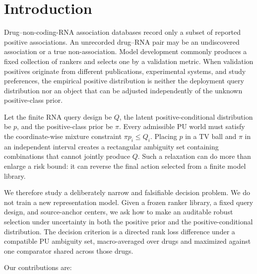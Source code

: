 \documentclass[preprint,review,12pt]{elsarticle}
\begin{document}
\section{Introduction}

Drug--non-coding-RNA association databases record only a subset of reported
positive associations. An unrecorded drug--RNA pair may be an undiscovered
association or a true non-association. Model development commonly produces a
fixed collection of rankers and selects one by a validation metric. When
validation positives originate from different publications, experimental
systems, and study preferences, the empirical positive distribution is neither
the deployment query distribution nor an object that can be adjusted
independently of the unknown positive-class prior.

Let the finite RNA query design be \(Q\), the latent positive-conditional
distribution be \(p\), and the positive-class prior be \(\pi\). Every admissible
PU world must satisfy the coordinate-wise mixture constraint
\(\pi p_i\leq Q_i\). Placing \(p\) in a TV ball and \(\pi\) in an independent
interval creates a rectangular ambiguity set containing combinations that
cannot jointly produce \(Q\). Such a relaxation can do more than enlarge a
risk bound: it can reverse the final action selected from a finite model
library.

We therefore study a deliberately narrow and falsifiable decision problem. We
do not train a new representation model. Given a frozen ranker library, a fixed
query design, and source-anchor centers, we ask how to make an auditable robust
selection under uncertainty in both the positive prior and the
positive-conditional distribution. The decision criterion is a directed rank
loss difference under a compatible PU ambiguity set, macro-averaged over drugs
and maximized against one comparator shared across those drugs.

Our contributions are:
\end{document}
